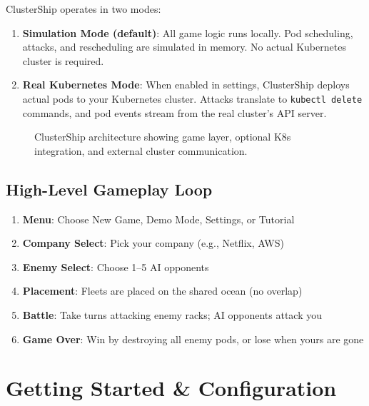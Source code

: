 \documentclass[11pt]{article}
\begin{document}
ClusterShip operates in two modes:

\begin{enumerate}
    \item \textbf{Simulation Mode (default)}: All game logic runs locally. Pod scheduling, attacks, and rescheduling are simulated in memory. No actual Kubernetes cluster is required.

    \item \textbf{Real Kubernetes Mode}: When enabled in settings, ClusterShip deploys actual pods to your Kubernetes cluster. Attacks translate to \texttt{kubectl delete} commands, and pod events stream from the real cluster's API server.
\end{enumerate}

\begin{figure}[H]
    \centering
    \caption{ClusterShip architecture showing game layer, optional K8s integration, and external cluster communication.}
    \label{fig:architecture}
\end{figure}

\subsection{High-Level Gameplay Loop}

\begin{enumerate}
    \item \textbf{Menu}: Choose New Game, Demo Mode, Settings, or Tutorial
    \item \textbf{Company Select}: Pick your company (e.g., Netflix, AWS)
    \item \textbf{Enemy Select}: Choose 1--5 AI opponents
    \item \textbf{Placement}: Fleets are placed on the shared ocean (no overlap)
    \item \textbf{Battle}: Take turns attacking enemy racks; AI opponents attack you
    \item \textbf{Game Over}: Win by destroying all enemy pods, or lose when yours are gone
\end{enumerate}

\section{Getting Started \& Configuration}
\end{document}
